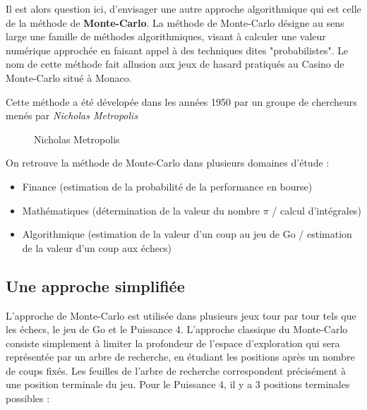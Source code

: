 \documentclass[a4paper]{article}
\begin{document}
\newpage

Il est alors question ici, d'envisager une autre approche algorithmique qui est celle de la méthode de \textbf{Monte-Carlo}.
La méthode de Monte-Carlo désigne au sens large une famille de méthodes algorithmiques, visant à calculer une valeur numérique approchée en faisant appel à des techniques dites "probabilistes".
Le nom de cette méthode fait allusion aux jeux de hasard pratiqués au Casino de Monte-Carlo situé à Monaco.




Cette méthode a été dévelopée dans les années 1950 par un groupe de chercheurs menés par \textit{Nicholas Metropolis}




\begin{figure}[!h] 
\centering
{}
\caption{Nicholas Metropolis} 
\end{figure} 


On retrouve la méthode de Monte-Carlo dans plusieurs domaines d'étude :

\vspace{0.4cm}

\begin{itemize}
\item Finance (estimation de la probabilité de la performance en bourse)
\item Mathématiques (détermination de la valeur du nombre $\pi$ / calcul d'intégrales) 
\item Algorithmique (estimation de la valeur d'un coup au jeu de Go / estimation de la valeur d'un coup aux échecs)

\end{itemize}






\subsection{Une approche simplifiée}

L'approche de Monte-Carlo est utilisée dans plusieurs jeux tour par tour tels que les échecs, le jeu de Go et le Puissance 4. L'approche classique du Monte-Carlo consiste simplement à limiter la profondeur de l'espace d'exploration qui sera représentée par un arbre de recherche, en étudiant les positions après un nombre de coups fixés.
Les feuilles de l'arbre de recherche correspondent précisément à une position terminale du jeu. 
Pour le Puissance 4, il y a 3 positions terminales possibles :
\vspace{0.2cm}
\end{document}
